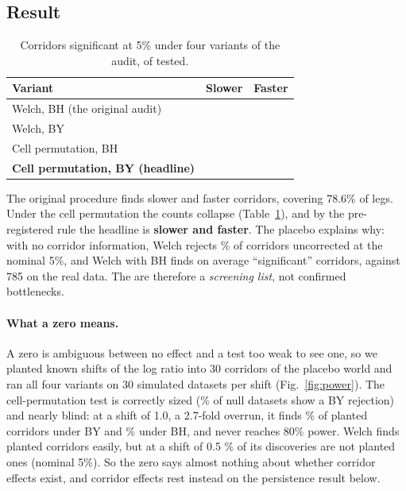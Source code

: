 \documentclass[pdflatex,sn-basic]{sn-jnl}
\begin{document}
\subsection{Result}
\begin{table}[!htb]
\caption{Corridors significant at 5\% under four variants of the audit, of \fzCorridorsTested{} tested.}
\label{tab:variants}
\centering
\begin{tabular}{@{}lrr@{}}
\toprule
Variant & Slower & Faster \\
\midrule
Welch, BH (the original audit) & \fzBottlenecks{} & \fzFasterCorridors{} \\
Welch, BY & \fzAuditByWelchSlower{} & \fzAuditByWelchFaster{} \\
Cell permutation, BH & \fzAuditBhPermSlower{} & \fzAuditBhPermFaster{} \\
\textbf{Cell permutation, BY (headline)} & \textbf{\fzAuditRobustHeadlineSlower{}} & \textbf{\fzAuditRobustHeadlineFaster{}} \\
\bottomrule
\end{tabular}
\end{table}
The original procedure finds \fzBottlenecks{} slower and \fzFasterCorridors{} faster corridors, covering 78.6\% of legs. Under the cell permutation the counts collapse (Table~\ref{tab:variants}), and by the pre-registered rule the headline is \textbf{\fzAuditRobustHeadlineSlower{} slower and \fzAuditRobustHeadlineFaster{} faster}. The placebo explains why: with no corridor information, Welch rejects \fzAuditPlaceboRejectionPct{}\% of corridors uncorrected at the nominal 5\%, and Welch with BH finds on average \fzAuditPlaceboDiscoveriesDpOne{} ``significant'' corridors, against 785 on the real data. The \fzBottlenecks{} are therefore a \emph{screening list}, not confirmed bottlenecks.

\paragraph{What a zero means.} A zero is ambiguous between no effect and a test too weak to see one, so we planted known shifts of the log ratio into 30 corridors of the placebo world and ran all four variants on 30 simulated datasets per shift (Fig.~\ref{fig:power}). The cell-permutation test is correctly sized (\fzPowerPermSizeByPct{}\% of null datasets show a BY rejection) and nearly blind: at a shift of 1.0, a 2.7-fold overrun, it finds \fzPowerByPermShiftOnePct{}\% of planted corridors under BY and \fzPowerBhPermShiftOnePct{}\% under BH, and never reaches 80\% power. Welch finds planted corridors easily, but at a shift of 0.5 \fzPowerWelchBhFdpShiftHalfPct{}\% of its discoveries are not planted ones (nominal 5\%). So the zero says almost nothing about whether corridor effects exist, and corridor effects rest instead on the persistence result below.
\end{document}
